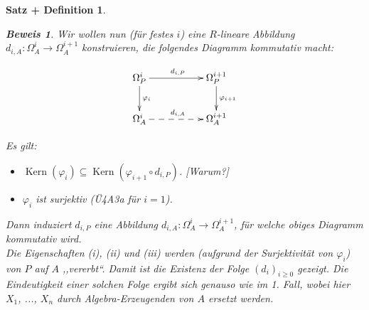 \documentclass[a4paper,12pt]{scrbook}
\theoremstyle{break}
\newtheorem{SatzDef}[Satz]{Satz + Definition}
\theoremstyle{nonumberbreak}
\newtheorem{Bew}{Beweis}
\theoremstyle{nonumberplain}
\DeclareMathOperator{\Kern}{Kern}
\begin{document}
\begin{SatzDef}
\begin{Bew}
Wir wollen nun (für festes $i$) eine $R$-lineare Abbildung $d_{i,A}: \Omega_A^{i}\to \Omega_A^{i+1}$ konstruieren, die folgendes Diagramm kommutativ macht:

\[
\begin{xy}
\xymatrix{
\Omega_P^i\ar[rr]^{d_{i,P}}\ar[d]^{\varphi_i}&&\Omega_P^{i+1}\ar[d]^{\varphi_{i+1}}\\
\Omega_A^i\ar@{-->}[rr]^{d_{i,A}}&&\Omega_A^{i+1}\\
}
\end{xy}
\]

Es gilt: 
\begin{itemize}
\item $\Kern(\varphi_i)\subseteq \Kern(\varphi_{i+1}\circ d_{i,P})$. [Warum?]
\item $\varphi_i$ ist surjektiv (Ü4A3a für $i=1$).
\end{itemize}

Dann induziert $d_{i,P}$ eine Abbildung $d_{i,A}: \Omega_A^{i}\to \Omega_A^{i+1}$, für welche obiges Diagramm kommutativ wird.\\
Die Eigenschaften (i), (ii) und (iii) werden (aufgrund der Surjektivität von $\varphi_i$) von $P$ auf $A$ ,,vererbt``. Damit ist die Existenz der Folge $\left(d_i\right)_{i\geq 0}$ gezeigt. Die Eindeutigkeit einer solchen Folge ergibt sich genauso wie im 1. Fall, wobei hier $X_1$, ..., $X_n$ durch Algebra-Erzeugenden von $A$ ersetzt werden.

\end{Bew}
\end{SatzDef}
\end{document}
